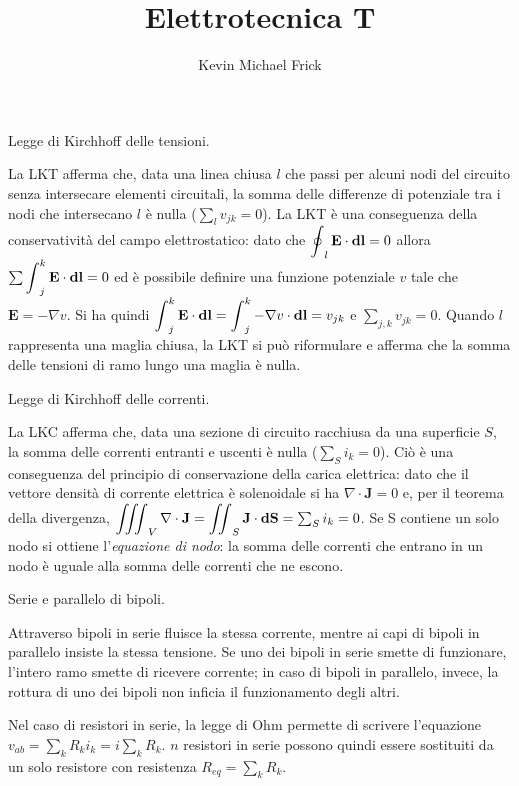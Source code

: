 \documentclass[answers, a4paper,12pt]{exam}
\title{Elettrotecnica T}
\author{Kevin Michael Frick}
\newcommand{\bigint}{\mathop{\mathlarger{\int}}}
\newcommand{\bigoint}{\mathop{\mathlarger{\oint}}}
\newcommand{\bigiiint}{\mathop{\mathlarger{\iiint}}}
\newcommand{\bigiint}{\mathop{\mathlarger{\iint}}}
\begin{document}
\maketitle
\begin{questions}
	\question
	Legge di Kirchhoff delle tensioni.
	\begin{solution}
	La LKT afferma che, data una linea chiusa $l$ che passi per alcuni nodi del circuito senza intersecare elementi circuitali, la somma delle differenze di potenziale tra i nodi che intersecano $l$ è nulla ($\sum_l v_{jk} = 0$). La LKT è una conseguenza della conservatività del campo elettrostatico: dato che $\bigoint_l \textbf{E} \cdot \textbf{dl} = 0$ allora $\sum\bigint_j^k \textbf{E} \cdot \textbf{dl} = 0$ ed è possibile definire una funzione potenziale $v$ tale che $\textbf{E} = - \nabla v$. Si ha quindi $\bigint_j^k \textbf{E} \cdot \textbf{dl} = \bigint_j^k - \nabla v \cdot \textbf{dl} = v_{jk}$ e $\sum_{j, k} v_{jk} = 0$. Quando $l$ rappresenta una maglia chiusa, la LKT si può riformulare e afferma che la somma delle tensioni di ramo lungo una maglia è nulla. 
	\end{solution}
	\question
	Legge di Kirchhoff delle correnti.
	\begin{solution}
		La LKC afferma che, data una sezione di circuito racchiusa da una superficie $S$, la somma delle correnti entranti e uscenti è nulla ($\sum_S i_k = 0$). Ciò è una conseguenza del principio di conservazione della carica elettrica: dato che il vettore densità di corrente elettrica è solenoidale si ha $\nabla \cdot \textbf{J} = 0$ e, per il teorema della divergenza, $\bigiiint_V \nabla \cdot \textbf{J} = \bigiint_S \textbf{J} \cdot \textbf{dS} = \sum_S i_k = 0$. Se S contiene un solo nodo si ottiene l'\textit{equazione di nodo}: la somma delle correnti che entrano in un nodo è uguale alla somma delle correnti che ne escono.
	\end{solution}
	\question
	Serie e parallelo di bipoli.
	\begin{solution}
		Attraverso bipoli in serie fluisce la stessa corrente, mentre ai capi di bipoli in parallelo insiste la stessa tensione. Se uno dei bipoli in serie smette di funzionare, l'intero ramo smette di ricevere corrente; in caso di bipoli in parallelo, invece, la rottura di uno dei bipoli non inficia il funzionamento degli altri. 
		
		Nel caso di resistori in serie, la legge di Ohm permette di scrivere l'equazione $v_{ab} = \sum_k R_k i_k = i \sum_k R_k$. $n$ resistori in serie possono quindi essere sostituiti da un solo resistore con resistenza $R_{eq} = \sum_k R_k$.
		

\end{solution}
\end{questions}
\end{document}
